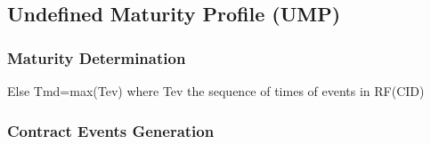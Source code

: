 \documentclass[9pt,oneside]{amsart}
\begin{document}


\vspace{\baselineskip}
\subsection{Undefined Maturity Profile (UMP)}
\subsubsection{Maturity Determination}
Else Tmd=max(Tev) where Tev the sequence of times of events in RF(CID)\par

\subsubsection{Contract Events Generation}


\end{document}

